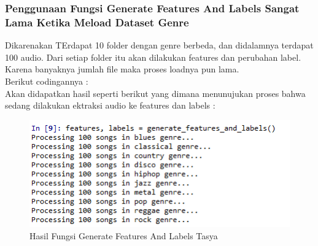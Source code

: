 \subsubsection{Penggunaan Fungsi Generate Features And Labels Sangat Lama Ketika Meload Dataset Genre}
\par Dikarenakan TErdapat 10 folder dengan genre berbeda, dan didalamnya terdapat 100 audio. Dari setiap folder itu akan dilakukan features dan perubahan label. Karena banyaknya jumlah file maka proses loadnya pun lama.\\
Berikut codingannya :\\

Akan didapatkan hasil seperti berikut yang dimana menunujukan proses bahwa sedang dilakukan ektraksi audio ke features dan labels :
\begin{figure}[ht]
\centering
\includegraphics[scale=0.5]{figures/chapter6tasya11.png}
\caption{Hasil Fungsi Generate Features And Labels Tasya}
\label{Praktek}
\end{figure}

